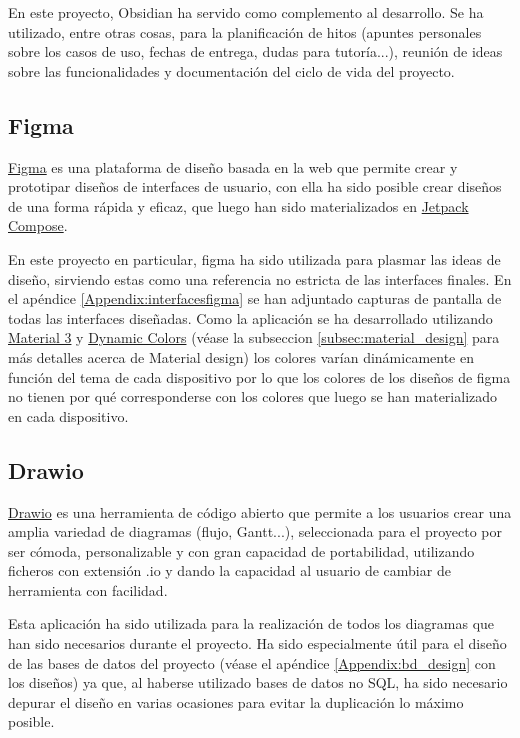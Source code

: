 En este proyecto, Obsidian ha servido como complemento al desarrollo. Se ha utilizado, entre otras cosas, para la planificación de hitos (apuntes personales sobre los casos de uso, fechas de entrega, dudas para tutoría...), reunión de ideas sobre las funcionalidades y documentación del ciclo de vida del proyecto.

\subsection{Figma}
\href{https://www.figma.com}{Figma} es una plataforma de diseño basada en la web que permite crear y prototipar diseños de interfaces de usuario, con ella ha sido posible crear diseños de una forma rápida y eficaz, que luego han sido materializados en \hyperlink{subsec:compose}{Jetpack Compose}. 

En este proyecto en particular, figma ha sido utilizada para plasmar las ideas de diseño, sirviendo estas como una referencia no estricta de las interfaces finales. En el apéndice \ref{Appendix:interfacesfigma} se han adjuntado capturas de pantalla de todas las interfaces diseñadas. Como la aplicación se ha desarrollado utilizando \href{https://m3.material.io/}{Material 3} y \href{https://m3.material.io/styles/color/system/overview}{Dynamic Colors} (véase la subseccion \ref{subsec:material_design} para más detalles acerca de Material design) los colores varían dinámicamente en función del tema de cada dispositivo por lo que los colores de los diseños de figma no tienen por qué corresponderse con los colores que luego se han materializado en cada dispositivo.
\subsection{Drawio}
\href{https://www.drawio.com/}{Drawio} es una herramienta de código abierto que permite a los usuarios crear una amplia variedad de diagramas (flujo, Gantt...), seleccionada para el proyecto por ser cómoda, personalizable y con gran capacidad de portabilidad, utilizando ficheros con extensión .io y dando la capacidad al usuario de cambiar de herramienta con facilidad. 

Esta aplicación ha sido utilizada para la realización de todos los diagramas que han sido necesarios durante el proyecto. Ha sido especialmente útil para el diseño de las bases de datos del proyecto (véase el apéndice \ref{Appendix:bd_design} con los diseños) ya que, al haberse utilizado bases de datos no SQL, ha sido necesario depurar el diseño en varias ocasiones para evitar la duplicación lo máximo posible.

